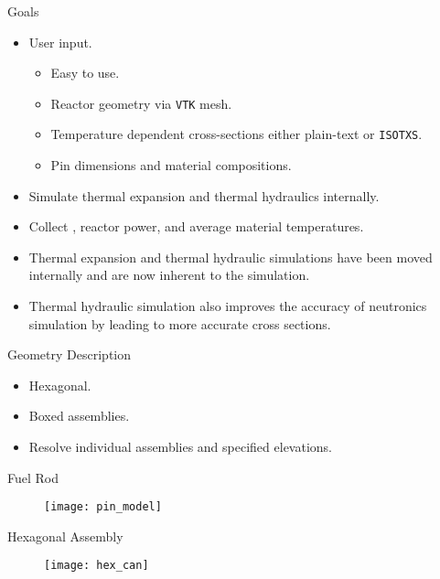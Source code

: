 \begin{frame}{Goals}
  \begin{itemize}
    \item User input.
      \begin{itemize}
        \item Easy to use.
        \item Reactor geometry via \texttt{VTK} mesh.
        \item Temperature dependent cross-sections either plain-text or 
          \texttt{ISOTXS}.
        \item Pin dimensions and material compositions.
      \end{itemize}
    \item Simulate thermal expansion and thermal hydraulics internally.
    \item Collect \keff, reactor power, and average material temperatures.
  \end{itemize}
  \vspace{0.25in}
  \begin{itemize}
    \item Thermal expansion and thermal hydraulic simulations have been moved
      internally and are now inherent to the simulation.
    \item Thermal hydraulic simulation also improves the accuracy of neutronics
      simulation by leading to more accurate cross sections.
  \end{itemize}
\end{frame}

\begin{frame}{Geometry Description}
  \begin{itemize}
    \item Hexagonal.
    \item Boxed assemblies.
    \item Resolve individual assemblies and specified elevations.
  \end{itemize}
\end{frame}

\begin{frame}{Fuel Rod}
  \begin{figure}
    \centering
    \texttt{[image: pin\_model]}
    \label{fig:pin_model}
  \end{figure}
\end{frame}

\begin{frame}{Hexagonal Assembly}
  \begin{figure}
    \centering
    \texttt{[image: hex\_can]}
    \label{fig:hex_can}
  \end{figure}
\end{frame}

